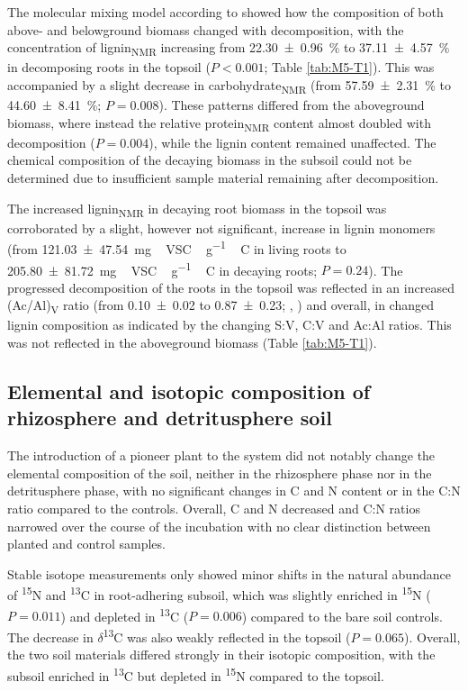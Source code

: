 The molecular mixing model according to \citet{Nelson2005} showed how the composition of both above- and belowground biomass changed with decomposition, with the concentration of lignin\textsubscript{NMR} increasing from \SI{22.30 \pm 0.96}{\percent} to \SI{37.11 \pm 4.57}{\percent} in decomposing roots in the topsoil (\(P < 0.001\); Table \ref{tab:M5-T1}). This was accompanied by a slight decrease in carbohydrate\textsubscript{NMR} (from \SI{57.59 \pm 2.31}{\percent} to \SI{44.60 \pm 8.41}{\percent}; \(P= 0.008\)). These patterns differed from the aboveground biomass, where instead the relative protein\textsubscript{NMR} content almost doubled with decomposition (\(P=0.004\)), while the lignin content remained unaffected. The chemical composition of the decaying biomass in the subsoil could not be determined due to insufficient sample material remaining after decomposition.

The increased lignin\textsubscript{NMR} in decaying root biomass in the topsoil was corroborated by a slight, however not significant, increase in lignin monomers (from \SI{121.03 \pm 47.54}{mg\,VSC\,\gram^{-1}\,C} in living roots to \SI{205.80 \pm 81.72}{mg\,VSC\,\gram^{-1}\,C} in decaying roots; \(P=0.24\)). The progressed decomposition of the roots in the topsoil was reflected in an increased (Ac/Al)\textsubscript{V} ratio (from \num{0.10 \pm 0.02} to \num{0.87 \pm 0.23}; \citeauthor{KoegelKnabner1988}, \citeyear{KoegelKnabner1988}) and overall, in changed lignin composition as indicated by the changing S:V, C:V and Ac:Al ratios. This was not reflected in the aboveground biomass (Table \ref{tab:M5-T1}).

\subsection{Elemental and isotopic composition of rhizosphere and detritusphere soil}

The introduction of a pioneer plant to the system did not notably change the elemental composition of the soil, neither in the rhizosphere phase nor in the detritusphere phase, with no significant changes in C and N content or in the C:N ratio compared to the controls. Overall, C and N decreased and C:N ratios narrowed over the course of the incubation with no clear distinction between planted and control samples.

Stable isotope measurements only showed minor shifts in the natural abundance of \textsuperscript{15}N and \textsuperscript{13}C in root-adhering subsoil, which was slightly enriched in \textsuperscript{15}N (\(P=0.011\)) and depleted in \textsuperscript{13}C (\(P=0.006\)) compared to the bare soil controls. The decrease in \(\delta\)\textsuperscript{13}C was also weakly reflected in the topsoil (\(P=0.065\)). Overall, the two soil materials differed strongly in their isotopic composition, with the subsoil enriched in \textsuperscript{13}C but depleted in \textsuperscript{15}N compared to the topsoil.


